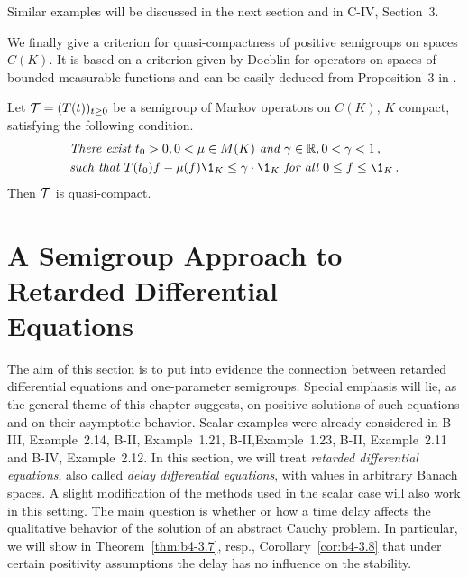 Similar examples will be discussed in the next section and in  C-IV, Section~3.

We finally give a criterion for quasi-compactness of positive semigroups on spaces $C(K)$. 
It is based on a criterion given by Doeblin for operators on spaces of bounded measurable functions and can be easily deduced from  Proposition~3 in \citet{lotz:1981}.
\begin{proposition}\label{prop:b4-2.13}
	Let $\mathcal{T} = (T(t))_{t \geq 0}$ be a semigroup of Markov operators on $C(K)$, $K$ compact, satisfying the following condition.
	\begin{equation}\label{eq:b4-2.12}	
		\begin{aligned}		
		&\textit{There exist } t_{0} > 0, 0 < \mu \in M(K) \textit{ and }  \gamma \in \mathbb{R}, 0 < \gamma < 1\,,\\
		&\textit{such that } T(t_{0})f - \mu(f)\1_K \leq \gamma \cdot \1_K \textit{ for all }  0 \leq f \leq \1_K\,.
		\end{aligned}
	\end{equation}
	Then $\mathcal{T}$ is quasi-compact.
\end{proposition}


\section{A Semigroup Approach to Retarded Differential \\
Equations}
\hspace{1cm}{\Large by Annette Grabosch und Ulrich Moustakas}
\vspace{.5cm}
\newline

The aim of this section is to put into evidence the connection between retarded differential equations and one-parameter semigroups.
Special emphasis will lie, as the general theme of this chapter suggests, on positive solutions of such equations and on their asymptotic behavior.
Scalar examples were already considered in B-III, Example~2.14, B-II, Example~1.21, B-II,Example~1.23, B-II, Example~2.11 and B-IV, Example~2.12.
In this section, we will treat \emph{retarded differential equations}, also called \emph{delay differential equations}, with values in arbitrary Banach spaces.
A slight modification of the methods used in the scalar case will also work in this setting.
The main question is whether or how a time delay affects the qualitative behavior of the solution of an abstract Cauchy problem.
In particular, we will show in Theorem~\ref{thm:b4-3.7}, resp., Corollary~\ref{cor:b4-3.8} that under certain positivity assumptions the delay has no influence on the stability.

